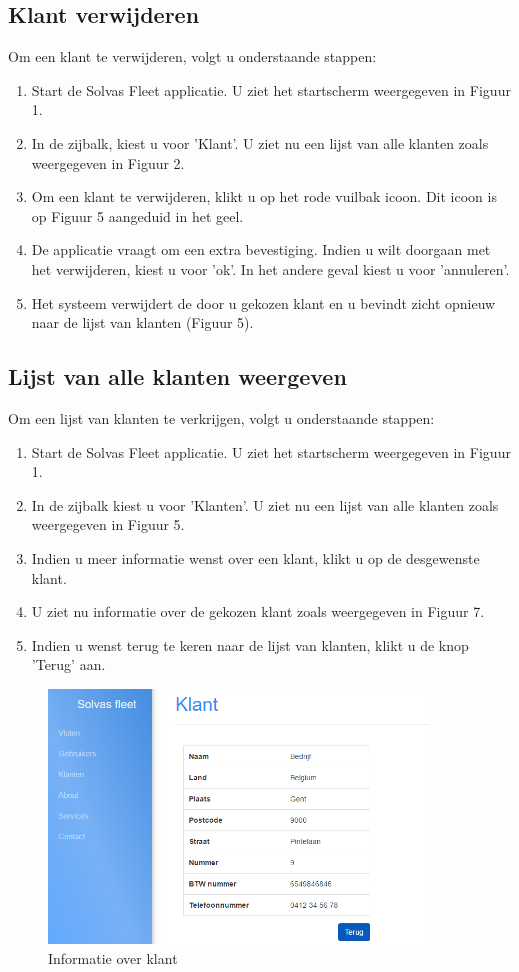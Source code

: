 \documentclass[11pt,openany]{article}
\begin{document}
\subsection{Klant verwijderen}
Om een klant te verwijderen, volgt u onderstaande stappen:
\begin{enumerate}
	\item Start de Solvas Fleet applicatie. U ziet het startscherm weergegeven in Figuur 1.
	\item In de zijbalk, kiest u voor 'Klant'. U ziet nu een lijst van alle klanten zoals weergegeven in Figuur 2.
	\item Om een klant te verwijderen, klikt u op het rode vuilbak icoon. Dit icoon is op Figuur 5 aangeduid in het geel.
	\item De applicatie vraagt om een extra bevestiging. Indien u wilt doorgaan met het verwijderen, kiest u voor 'ok'. In het andere geval kiest u voor 'annuleren'.
	\item Het systeem verwijdert de door u gekozen klant en u bevindt zicht opnieuw naar de lijst van klanten (Figuur 5).
\end{enumerate}

\subsection{Lijst van alle klanten weergeven}
Om een lijst van klanten te verkrijgen, volgt u onderstaande stappen:
\begin{enumerate}
	\item Start de Solvas Fleet applicatie. U ziet het startscherm weergegeven in Figuur 1.
	\item In de zijbalk kiest u voor 'Klanten'. U ziet nu een lijst van alle klanten zoals weergegeven in Figuur 5.
	\item Indien u meer informatie wenst over een klant, klikt u op de desgewenste klant. 
	\item U ziet nu informatie over de gekozen klant zoals weergegeven in Figuur 7. 
	\item Indien u wenst terug te keren naar de lijst van klanten, klikt u de knop 'Terug' aan.
\end{enumerate}

\begin{figure}
	\centering
	\includegraphics[width=0.9\textwidth]{fig7.png}
	\caption{Informatie over klant}
\end{figure}
\newpage
\end{document}
